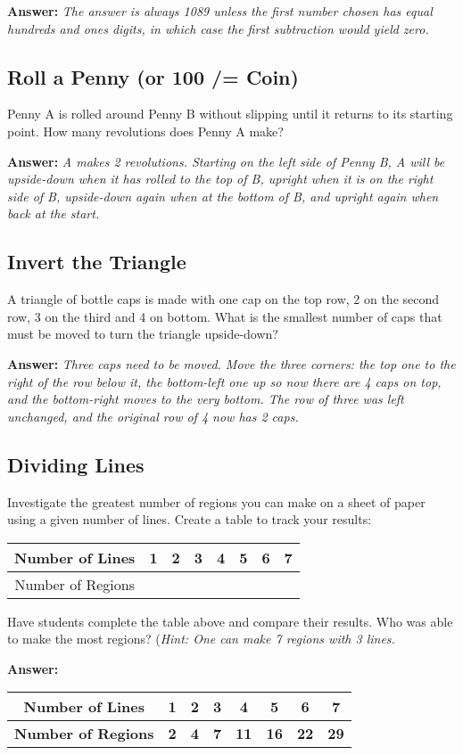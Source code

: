 	\textbf{Answer:} \emph{The answer is always 1089 unless the first number chosen has equal hundreds and ones digits, in which case the first subtraction would yield zero.}
	\subsection{Roll a Penny (or 100 /= Coin)}
	Penny A is rolled around Penny B without slipping until it returns to its starting point. How many revolutions does Penny A make?
	
	\textbf{Answer:} \emph{A makes 2 revolutions. Starting on the left side of Penny B, A will be upside-down when it has rolled to the top of B, upright when it is on the right side of B, upside-down again when at the bottom of B, and upright again when back at the start.}
	
	\subsection{Invert the Triangle}
	A triangle of bottle caps is made with one cap on the top row, 2 on the second row, 3 on the third and 4 on bottom. What is the smallest number of caps that must be moved to turn the triangle upside-down?
	
	\textbf{Answer:} \emph{Three caps need to be moved. Move the three corners: the top one to the right of the row below it, the bottom-left one up so now there are 4 caps on top, and the bottom-right moves to the very bottom. The row of three was left unchanged, and the original row of 4 now has 2 caps.}
	\subsection{Dividing Lines}
	Investigate the greatest number of regions you can make on a sheet of paper using a given number of lines. Create a table to track your results:
	\begin{center}
	\begin{tabular}{|c|c|c|c|c|c|c|c|} \hline
	Number of Lines & 1 & 2 & 3 & 4 & 5 & 6 & 7\\ \hline
	Number of Regions & & & & & & & \\ \hline
	\end{tabular}
	\end{center}
	Have students complete the table above and compare their results. Who was able to make the most regions? (\textit{Hint: One can make 7 regions with 3 lines.}
	
	\textbf{Answer:}
	\begin{center}
	\begin{tabular}{|c|c|c|c|c|c|c|c|} \hline
	\textbf{Number of Lines} & \textbf{1} & \textbf{2} & \textbf{3} & \textbf{4} & \textbf{5} & \textbf{6} & \textbf{7}\\ \hline
	\textbf{Number of Regions} & \textbf{2} & \textbf{4} & \textbf{7} & \textbf{11} & \textbf{16} & \textbf{22} & \textbf{29} \\ \hline
	\end{tabular}
	\end{center}	
	
